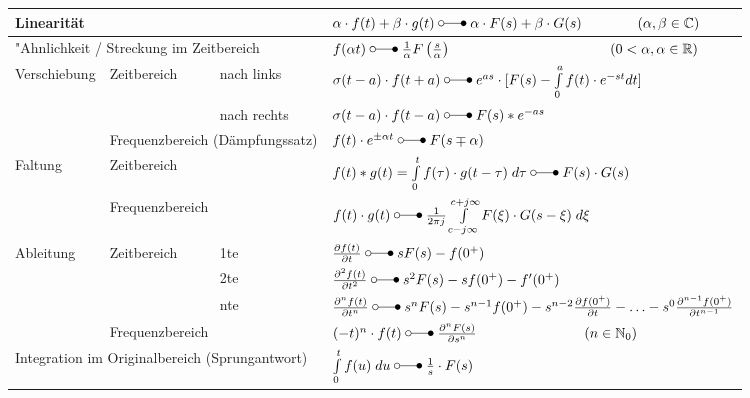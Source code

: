 	  \renewcommand{\arraystretch}{2}
		\begin{tabular}{|p{2.5cm}|p{3cm}|p{2.5cm}p{10cm}|}
			\hline
				\multicolumn{3}{|l}{Linearität}   &  $\alpha\cdot f(t) + \beta\cdot g(t) \; \laplace \; \alpha\cdot F(s) + \beta\cdot G(s) \qquad\qquad (\alpha, \beta \in\mathbb{C})$ \\ 
			\hline
				\multicolumn{3}{|l}{"Ahnlichkeit / Streckung im Zeitbereich}   &  $f(\alpha t) \; \laplace \; \frac{1}{\alpha}F \left (\frac{s}{\alpha} \right ) \hspace{4cm} (0 <\alpha, \alpha \in\mathbb{R})$ \\
			\hline
			\hline
				\multirow{3}{*}{Verschiebung} & \multirow{2}{*}{Zeitbereich} & nach links &  $\sigma(t-a) \cdot f(t + a) \; \laplace \; e^{as} \cdot [F(s) - \int\limits_0^{a} f(t) \cdot e^{-st} dt]$	 \\ \cline{3-4} 
				&  & nach rechts  & $\sigma(t-a) \cdot f(t - a) \; \laplace \; F(s)*e^{-as}$ \\ \cline{2-4}
				& \multicolumn{2}{l}{Frequenzbereich (Dämpfungssatz)} & $f(t) \cdot e^{\pm\alpha t} \; \laplace \; F(s\mp\alpha)$\\ 
			\hline
			\hline
				\multirow{2}{*}{Faltung} & \multicolumn{2}{l}{Zeitbereich} & $f(t) \ast g(t) = \int\limits_{0}^{t} f(\tau) \cdot g(t-\tau) \; d\tau \; \laplace \; F(s)
				\cdot G(s)$ \\ \cline{2-4} 
				& \multicolumn{2}{l}{Frequenzbereich} &  $f(t) \cdot g(t) \; \laplace \; \frac{1}{2\pi j}\int\limits_{c-j\infty}^{c+j\infty}
				F(\xi) \cdot G(s-\xi) \; d\xi$\\ 
			\hline
			\hline
				\multirow{4}{*}{Ableitung} & \multirow{3}{*}{Zeitbereich} & 1te & 	$\frac{\partial f(t)}{\partial t} \; \laplace \; sF(s)-f(0^+)$ \\ \cline{3-4}
				&  & 2te  &  $\frac{\partial^2 f(t)}{\partial t^2} \; \laplace \; s^2F(s)		-sf(0^+) -f'(0^+)$\\ \cline{3-4}
				&  & nte  &  $\frac{\partial^n f(t)}{\partial t^n} \; \laplace \; s^nF(s)
				-s^{n-1}f(0^+)-s^{n-2}\frac{\partial f(0^+)}{\partial t}-\ldots
				-s^0\frac{\partial^{n-1} f(0^+)}{\partial t^{n-1}}$\\ \cline{2-4} 
				& \multicolumn{2}{l}{Frequenzbereich} & $(-t)^n \cdot f(t) \; \laplace \;  \frac{\partial^n F(s)}{\partial s^n} \qquad \hspace{2cm} (n \in \mathbb{N}_0)$\\
			\hline
			\hline
				\multicolumn{3}{|l}{Integration im Originalbereich (Sprungantwort)}   &  $\int\limits_0^t f(u) \; du \; \laplace \; \frac{1}{s}\cdot F(s)$ \\

\end{tabular}
